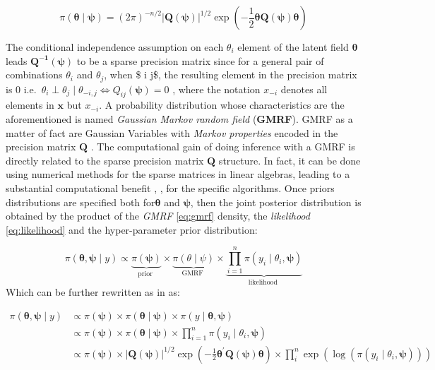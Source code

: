 \documentclass[
  12pt,
  a4paper,
  oneside]{book}
\theoremstyle{definition}
\theoremstyle{definition}
\theoremstyle{definition}
\theoremstyle{remark}
\begin{document}
\begin{equation}
\pi(\boldsymbol{\theta} \mid \boldsymbol{\psi})=(2 \pi)^{-n / 2}| \boldsymbol{Q(\psi)}|^{1 / 2} \exp \left(-\frac{1}{2} \boldsymbol{\theta} \boldsymbol{Q(\psi)} \boldsymbol{\theta}\right)
\label{eq:gmrf}
\end{equation}

The conditional independence assumption on each \(\theta_i\) element of the latent field \(\boldsymbol{\theta}\) leads \(\boldsymbol{Q^{-1}(\psi)}\) to be a sparse precision matrix since for a general pair of combinations \(\theta_{i}\) and \(\theta_{j}\), when \$ i \neq j\$, the resulting element in the precision matrix is 0 i.e.~\(\theta_{i} \perp \theta_{j} \mid \theta_{-i, j} \Longleftrightarrow Q_{i j}(\boldsymbol{\psi})=0\) \citeyearpar{Blangiardo-Cameletti}, where the notation \(x_{-i}\) denotes all elements in \(\boldsymbol{x}\) but \(x_{-i}\).
A probability distribution whose characteristics are the aforementioned is named \emph{Gaussian Markov random field} (\textbf{GMRF}). GMRF as a matter of fact are Gaussian Variables with \emph{Markov properties} encoded in the precision matrix \(\boldsymbol{Q}\) \citep{Rue2009}. The computational gain of doing inference with a GMRF is directly related to the sparse precision matrix \(\boldsymbol{Q}\) structure. In fact, it can be done using numerical methods for the sparse matrices in linear algebras, leading to a substantial computational benefit \citep{Cameletti2012}, \citep{GMRFRue}, for the specific algorithms.
Once priors distributions are specified both for\(\boldsymbol{\theta}\) and \(\boldsymbol{\psi}\), then the joint posterior distribution is obtained by the product of the \emph{GMRF} \eqref{eq:gmrf} density, the \emph{likelihood} \eqref{eq:likelihood} and the hyper-parameter prior distribution:

\[
\pi(\boldsymbol{\theta}, \boldsymbol{\psi} \mid y)\propto  \underbrace{\pi(\boldsymbol{\psi})}_{\text {prior }} \times \underbrace{\pi(\theta \mid \psi)}_{\text {GMRF }} \times \underbrace{\prod_{i=1}^{n} \pi\left(y_{i} \mid \theta_{i}, \boldsymbol{\psi}\right)}_{\text {likelihood }}
\]
Which can be further rewritten as in \citep{Blangiardo-Cameletti} as:

\[
\begin{aligned}
\pi(\boldsymbol{\theta}, \boldsymbol{\psi} \mid y) & \propto \pi(\boldsymbol{\psi}) \times \pi(\boldsymbol{\theta} \mid \boldsymbol{\psi}) \times \pi(y \mid \boldsymbol{\theta}, \boldsymbol{\psi}) \\
& \propto \pi(\boldsymbol{\psi}) \times \pi(\boldsymbol{\theta} \mid \boldsymbol{\psi}) \times \prod_{i=1}^{n} \pi\left(y_{i} \mid \theta_{i}, \boldsymbol{\psi}\right) \\
& \propto \pi(\boldsymbol{\psi}) \times|\boldsymbol{Q}(\boldsymbol{\psi})|^{1 / 2} \exp \left(-\frac{1}{2} \boldsymbol{\theta}^{\prime} \boldsymbol{Q}(\boldsymbol{\psi}) \boldsymbol{\theta}\right) \times \prod_{i}^{n} \exp \left(\log \left(\pi\left(y_{i} \mid \theta_{i}, \boldsymbol{\psi}\right)\right)\right)
\end{aligned}
\]
\end{document}
